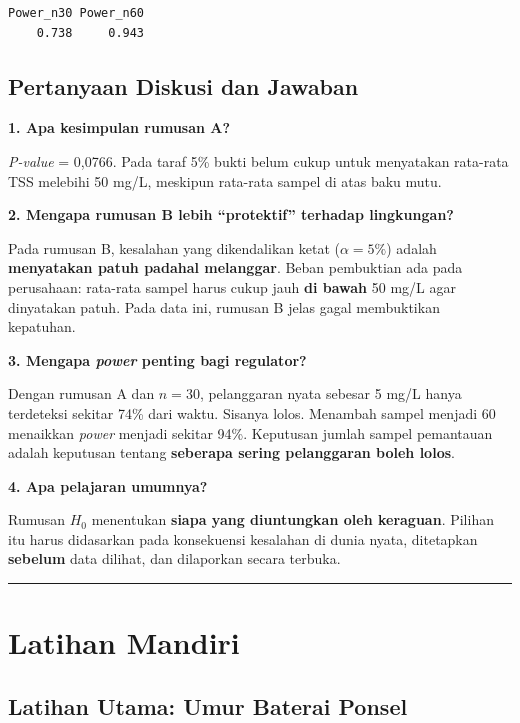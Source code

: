 \documentclass[
  indonesian,
  letterpaper,
]{book}
\begin{document}
\begin{verbatim}
Power_n30 Power_n60 
    0.738     0.943 
\end{verbatim}

\section{Pertanyaan Diskusi dan
Jawaban}\label{pertanyaan-diskusi-dan-jawaban-1}

\textbf{1. Apa kesimpulan rumusan A?}

\emph{P-value} = 0,0766. Pada taraf 5\% bukti belum cukup untuk
menyatakan rata-rata TSS melebihi 50 mg/L, meskipun rata-rata sampel di
atas baku mutu.

\textbf{2. Mengapa rumusan B lebih ``protektif'' terhadap lingkungan?}

Pada rumusan B, kesalahan yang dikendalikan ketat (\(\alpha = 5\%\))
adalah \textbf{menyatakan patuh padahal melanggar}. Beban pembuktian ada
pada perusahaan: rata-rata sampel harus cukup jauh \textbf{di bawah} 50
mg/L agar dinyatakan patuh. Pada data ini, rumusan B jelas gagal
membuktikan kepatuhan.

\textbf{3. Mengapa \emph{power} penting bagi regulator?}

Dengan rumusan A dan \(n = 30\), pelanggaran nyata sebesar 5 mg/L hanya
terdeteksi sekitar 74\% dari waktu. Sisanya lolos. Menambah sampel
menjadi 60 menaikkan \emph{power} menjadi sekitar 94\%. Keputusan jumlah
sampel pemantauan adalah keputusan tentang \textbf{seberapa sering
pelanggaran boleh lolos}.

\textbf{4. Apa pelajaran umumnya?}

Rumusan \(H_0\) menentukan \textbf{siapa yang diuntungkan oleh
keraguan}. Pilihan itu harus didasarkan pada konsekuensi kesalahan di
dunia nyata, ditetapkan \textbf{sebelum} data dilihat, dan dilaporkan
secara terbuka.

\begin{center}\rule{0.5\linewidth}{0.5pt}\end{center}


\chapter{Latihan Mandiri}\label{latihan-mandiri-1}

\section{Latihan Utama: Umur Baterai
Ponsel}\label{latihan-utama-umur-baterai-ponsel}
\end{document}
